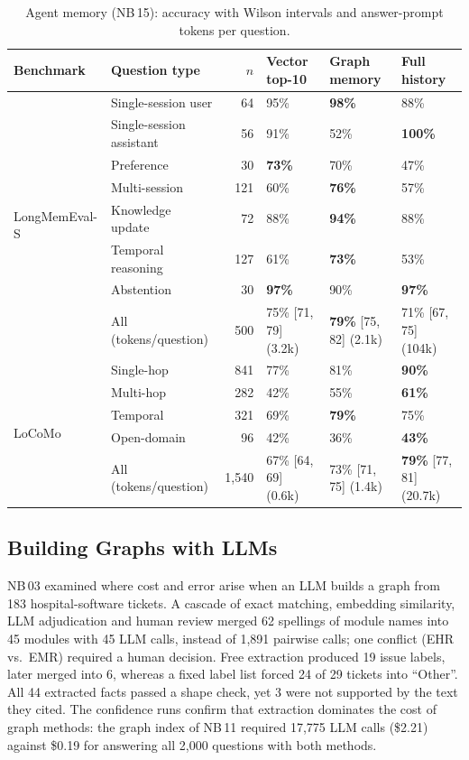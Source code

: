 \documentclass[11pt,a4paper]{article}
\newcommand{\nb}[1]{NB\,#1}
\begin{document}
\begin{table}[t]
\centering
\small
\caption{Agent memory (\nb{15}): accuracy with Wilson intervals and answer-prompt tokens per question.}
\label{tab:memory}
\footnotesize\setlength{\tabcolsep}{3.5pt}
\begin{tabular}{@{}llrlll@{}}
\toprule
Benchmark & Question type & $n$ & Vector top-10 & Graph memory & Full history \\
\midrule
\multirow{8}{*}{LongMemEval-S}
 & Single-session user & 64 & 95\% & \textbf{98\%} & 88\% \\
 & Single-session assistant & 56 & 91\% & 52\% & \textbf{100\%} \\
 & Preference & 30 & \textbf{73\%} & 70\% & 47\% \\
 & Multi-session & 121 & 60\% & \textbf{76\%} & 57\% \\
 & Knowledge update & 72 & 88\% & \textbf{94\%} & 88\% \\
 & Temporal reasoning & 127 & 61\% & \textbf{73\%} & 53\% \\
 & Abstention & 30 & \textbf{97\%} & 90\% & \textbf{97\%} \\
 & All (tokens/question) & 500 & 75\% [71, 79] (3.2k) & \textbf{79\%} [75, 82] (2.1k) & 71\% [67, 75] (104k) \\
\midrule
\multirow{5}{*}{LoCoMo}
 & Single-hop & 841 & 77\% & 81\% & \textbf{90\%} \\
 & Multi-hop & 282 & 42\% & 55\% & \textbf{61\%} \\
 & Temporal & 321 & 69\% & \textbf{79\%} & 75\% \\
 & Open-domain & 96 & 42\% & 36\% & \textbf{43\%} \\
 & All (tokens/question) & 1{,}540 & 67\% [64, 69] (0.6k) & 73\% [71, 75] (1.4k) & \textbf{79\%} [77, 81] (20.7k) \\
\bottomrule
\end{tabular}
\end{table}

\subsection{Building Graphs with LLMs}
\label{sec:building}

\nb{03} examined where cost and error arise when an LLM builds a graph from 183 hospital-software tickets. A
cascade of exact matching, embedding similarity, LLM adjudication and human review merged 62 spellings of module
names into 45 modules with 45 LLM calls, instead of 1{,}891 pairwise calls; one conflict (EHR vs.\ EMR) required a
human decision. Free extraction produced 19 issue labels, later merged into 6, whereas a fixed label list forced 24
of 29 tickets into ``Other''. All 44 extracted facts passed a shape check, yet 3 were not supported by the text
they cited. The confidence runs confirm that extraction dominates the cost of graph methods: the graph index of
\nb{11} required 17{,}775 LLM calls (\$2.21) against \$0.19 for answering all 2{,}000 questions with both methods.
\end{document}
